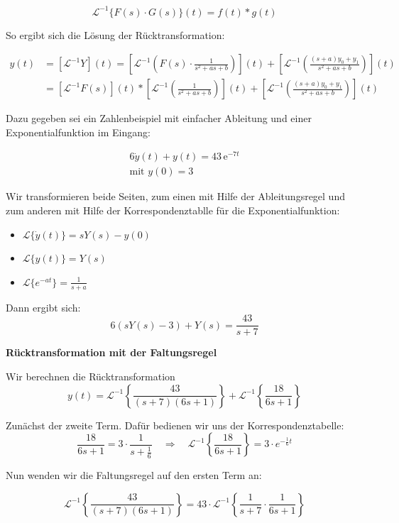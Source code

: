 \[
\mathcal{L}^{-1} \{ F(s) \cdot G(s) \}(t) = f(t) * g(t)
\]

So ergibt sich die Lösung der Rücktransformation:

\begin{align*}
y(t) &= [\mathcal{L}^{-1}Y](t) = \left[ \mathcal{L}^{-1} \left( F(s) \cdot \frac{1}{s^2 + as + b} \right) \right](t) 
+ \left[ \mathcal{L}^{-1} \left( \frac{(s+a)y_0 + y_1}{s^2 + as + b} \right) \right](t) \\
&= [\mathcal{L}^{-1}F(s)](t) * \left[ \mathcal{L}^{-1} \left( \frac{1}{s^2 + as + b} \right) \right](t) 
+ \left[ \mathcal{L}^{-1} \left( \frac{(s+a)y_0 + y_1}{s^2 + as + b} \right) \right](t)
\end{align*}
\cite[S.~886]{buch1}

Dazu gegeben sei ein Zahlenbeispiel mit einfacher Ableitung und einer Exponentialfunktion im Eingang:

\begin{align}
    6\dot{y}(t) + y(t) = 43 \, \mathrm{e}^{-7t} \\
    \text{mit } y(0) = 3
\end{align}

Wir transformieren beide Seiten, zum einen mit Hilfe der Ableitungsregel und zum anderen mit Hilfe der Korrespondenztablle für die Exponentialfunktion:
\begin{itemize}
  \item $\mathcal{L}\{\dot{y}(t)\} = sY(s) - y(0)$
  \item $\mathcal{L}\{y(t)\} = Y(s)$
  \item $\mathcal{L}\{e^{-at}\} = \frac{1}{s + a}$
\end{itemize}

Dann ergibt sich:
\[
6(sY(s) - 3) + Y(s) = \frac{43}{s + 7}
\]

\textbf{Rücktransformation mit der Faltungsregel}

Wir berechnen die Rücktransformation
\[
y(t) = \mathcal{L}^{-1} \left\{ \frac{43}{(s + 7)(6s + 1)} \right\} + \mathcal{L}^{-1} \left\{ \frac{18}{6s + 1} \right\}
\]

Zunächst der zweite Term. Dafür bedienen wir uns der Korrespondenztabelle:
\[
\frac{18}{6s + 1} = 3 \cdot \frac{1}{s + \frac{1}{6}} \quad \Rightarrow \quad \mathcal{L}^{-1} \left\{ \frac{18}{6s + 1} \right\} = 3 \cdot e^{-\frac{1}{6}t}
\]

Nun wenden wir die Faltungsregel auf den ersten Term an:

\[
\mathcal{L}^{-1} \left\{ \frac{43}{(s + 7)(6s + 1)} \right\}
= 43 \cdot \mathcal{L}^{-1} \left\{ \frac{1}{s + 7} \cdot \frac{1}{6s + 1} \right\}
\]

